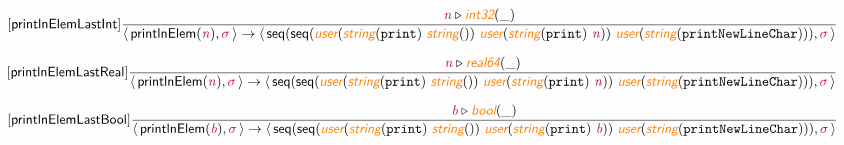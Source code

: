 \documentclass[10pt,leqno,fleqn]{article}
\newcommand{\artVariable}[1]{\mbox{\color{purple}\em #1\/}}
\newcommand{\artConstructor}[1]{\mbox{\sf #1}}
\newcommand{\artCaseInsensitiveLiteral}[1]{\mbox{\tt #1}}
\newcommand{\artSpecial}[1]{\mbox{\color{orange}\sf\em #1}}
\begin{document}
\begin{equation}
\tag*{[\artConstructor{\sf printlnElemLastInt}]}
\begin{split}\frac{ \artVariable{n}\triangleright \artSpecial{int32}(\_) }{\langle\, \artConstructor{\sf printlnElem}(\artVariable{n}), \artVariable{$\sigma$}\,\rangle \rightarrow \langle\, \artConstructor{\sf seq}(\artConstructor{\sf seq}(\artSpecial{user}(\artSpecial{string}(\artCaseInsensitiveLiteral{print})\ \artSpecial{string}(\artCaseInsensitiveLiteral{ }))\ \artSpecial{user}(\artSpecial{string}(\artCaseInsensitiveLiteral{print})\ \artVariable{n}))\ \artSpecial{user}(\artSpecial{string}(\artCaseInsensitiveLiteral{printNewLineChar}))), \artVariable{$\sigma$}\,\rangle }
\end{split}
\end{equation}

\begin{equation}
\tag*{[\artConstructor{\sf printlnElemLastReal}]}
\begin{split}\frac{ \artVariable{n}\triangleright \artSpecial{real64}(\_) }{\langle\, \artConstructor{\sf printlnElem}(\artVariable{n}), \artVariable{$\sigma$}\,\rangle \rightarrow \langle\, \artConstructor{\sf seq}(\artConstructor{\sf seq}(\artSpecial{user}(\artSpecial{string}(\artCaseInsensitiveLiteral{print})\ \artSpecial{string}(\artCaseInsensitiveLiteral{ }))\ \artSpecial{user}(\artSpecial{string}(\artCaseInsensitiveLiteral{print})\ \artVariable{n}))\ \artSpecial{user}(\artSpecial{string}(\artCaseInsensitiveLiteral{printNewLineChar}))), \artVariable{$\sigma$}\,\rangle }
\end{split}
\end{equation}

\begin{equation}
\tag*{[\artConstructor{\sf printlnElemLastBool}]}
\begin{split}\frac{ \artVariable{b}\triangleright \artSpecial{bool}(\_) }{\langle\, \artConstructor{\sf printlnElem}(\artVariable{b}), \artVariable{$\sigma$}\,\rangle \rightarrow \langle\, \artConstructor{\sf seq}(\artConstructor{\sf seq}(\artSpecial{user}(\artSpecial{string}(\artCaseInsensitiveLiteral{print})\ \artSpecial{string}(\artCaseInsensitiveLiteral{ }))\ \artSpecial{user}(\artSpecial{string}(\artCaseInsensitiveLiteral{print})\ \artVariable{b}))\ \artSpecial{user}(\artSpecial{string}(\artCaseInsensitiveLiteral{printNewLineChar}))), \artVariable{$\sigma$}\,\rangle }
\end{split}
\end{equation}
\end{document}
